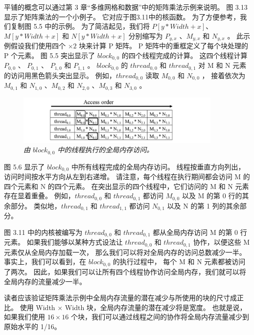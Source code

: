 平铺的概念可以通过第 3 章“多维网格和数据”中的矩阵乘法示例来说明。 图 3.13 显示了矩阵乘法的一个小例子。 
它对应于图3.11中的核函数。 为了方便参考，我们复制图 5.5 中的示例。 
为了简洁起见，我们将 $P[y * Width+x]$、$M[y * Width+x]$ 和 $N[y * Width+x]$ 
分别缩写为 $P_{y,x}$ 、$M_{y, x}$ 和 $N_{y,x}$ 。 
此示例假设我们使用四个 $\times 2$ 块来计算 P 矩阵。 P 矩阵中的重框定义了每个块处理的 P 个元素。 
图 5.5 突出显示了 $block_{0,0}$ 的四个线程完成的计算。 
这四个线程计算 $P_{0,0}$ 、 $P_{0,1}$ 、 $P_{1,0}$ 和 $P_{1,1}$ 。 
$block_{0,0}$ 的 $thread_{0,0}$ 和 $thread_{0,1}$ 对 M 和 N 元素的访问用黑色箭头突出显示。 
例如，$thread_{0,0}$ 读取 $M_{0,0}$ 和 $N_{0,0}$ ，
接着依次为 $M_{0,1}$ 和 $N_{1,0}$ 、$M_{0,2}$ 和 $N_{2,0}$ 、$M_{0,3}$ 和 $N_{3,0}$ 。

\begin{figure}[H]
	\centering
	\includegraphics[width=0.9\textwidth]{figs/F5.6.png}
	\caption{\textit{由 $block_{0,0}$ 中的线程执行的全局内存访问。}}
\end{figure}

图 5.6 显示了 $block_{0,0}$ 中所有线程完成的全局内存访问。 线程按垂直方向列出，访问时间按水平方向从左到右递增。 
请注意，每个线程在执行期间都会访问 M 的四个元素和 N 的四个元素。 
在突出显示的四个线程中，它们访问的 M 和 N 元素存在显着重叠。 
例如，$thread_{0,0}$ 和 $thread_{0,1}$ 都访问 $M_{0,0}$ 以及 M 的第 0 行的其余部分。
类似地，$thread_{0,1}$ 和 $thread_{1,1}$ 都访问 $N_{0,1}$ 以及 N 的第 1 列的其余部分。

图 3.11 中的内核被编写为 $thread_{0,0}$ 和 $thread_{0,1}$ 都从全局内存访问 M 的第 0 行元素。 
如果我们能够以某种方式设法让 $thread_{0,0}$ 和 $thread_{0,1}$ 协作，以便这些 M 元素仅从全局内存加载一次，
那么我们可以将对全局内存的访问总数减少一半。 事实上，我们可以看到，在 $block_{0,0}$ 的执行过程中，
每个 M 和 N 元素都被访问了两次。 因此，如果我们可以让所有四个线程协作访问全局内存，我们就可以将全局内存的流量减少一半。

读者应该验证矩阵乘法示例中全局内存流量的潜在减少与所使用的块的尺寸成正比。 
使用 Width $\times$ Width 块，全局内存流量的潜在减少将是宽度。 
也就是说，如果我们使用 $16 \times 16$ 个块，我们可以通过线程之间的协作将全局内存流量减少到原始水平的 1/16。

